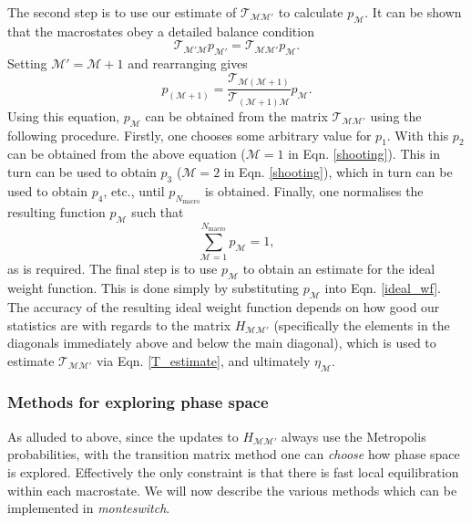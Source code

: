 \documentclass{report}
\begin{document}
The second step is to use our estimate of $\mathcal{T}_{\mathcal{MM}'}$ to calculate $p_{\mathcal{M}}$. It can be shown that the macrostates obey a
detailed balance condition
\begin{equation}
\mathcal{T}_{\mathcal{M}'\mathcal{M}}p_{\mathcal{M}'}=\mathcal{T}_{\mathcal{MM}'}p_{\mathcal{M}}.
\end{equation}
Setting $\mathcal{M}'=\mathcal{M}+1$ and rearranging gives
\begin{equation}\label{shooting}
p_{(\mathcal{M}+1)}=\frac{\mathcal{T}_{\mathcal{M}(\mathcal{M}+1)}}{\mathcal{T}_{(\mathcal{M}+1)\mathcal{M}}}p_{\mathcal{M}}.
\end{equation}
Using this equation, $p_{\mathcal{M}}$ can be obtained from the matrix $\mathcal{T}_{\mathcal{M}\mathcal{M}'}$ using the following procedure.
Firstly, one chooses some arbitrary value for $p_1$. With this $p_2$ can be obtained from the above equation ($\mathcal{M}=1$ in Eqn. \eqref{shooting}). 
This in turn can be used to obtain $p_3$ ($\mathcal{M}=2$ in Eqn. \eqref{shooting}), which in turn can be used to obtain $p_4$, etc., until
$p_{N_{\text{macro}}}$ is obtained. Finally, one normalises the resulting function $p_{\mathcal{M}}$ such that
\begin{equation}
\sum_{\mathcal{M}=1}^{N_{\text{macro}}}p_{\mathcal{M}}=1,
\end{equation}
as is required. The final step is to use $p_{\mathcal{M}}$ to obtain an estimate for the ideal weight function. This is done simply by substituting 
$p_{\mathcal{M}}$ into Eqn. \eqref{ideal_wf}. The accuracy of the resulting ideal weight function depends on how good our statistics are with regards to
the matrix $H_{\mathcal{M}\mathcal{M}'}$ (specifically the elements in the diagonals immediately above and below the main diagonal), which is used to
estimate $\mathcal{T}_{\mathcal{M}\mathcal{M}'}$ via Eqn. \eqref{T_estimate}, and ultimately $\eta_{\mathcal{M}}$. 


\subsubsection{Methods for exploring phase space}
As alluded to above, since the updates to $H_{\mathcal{M}\mathcal{M}'}$ always use the Metropolis probabilities, with the transition matrix method one
can \emph{choose} how phase space is explored. Effectively the only constraint is that there is fast local equilibration within each macrostate. We will now
describe the various methods which can be implemented in \emph{monteswitch}.
\end{document}
